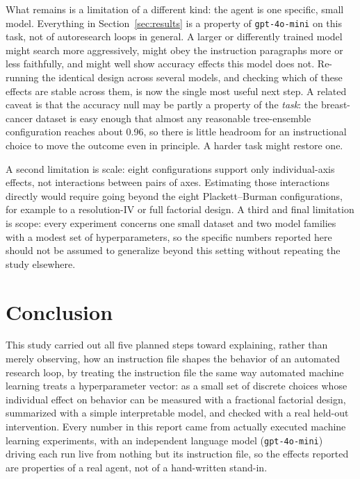 \documentclass[11pt]{article}
\begin{document}
What remains is a limitation of a different kind: the agent is one specific, small model. Everything in Section~\ref{sec:results} is a property of \texttt{gpt-4o-mini} on this task, not of autoresearch loops in general. A larger or differently trained model might search more aggressively, might obey the instruction paragraphs more or less faithfully, and might well show accuracy effects this model does not. Re-running the identical design across several models, and checking which of these effects are stable across them, is now the single most useful next step. A related caveat is that the accuracy null may be partly a property of the \emph{task}: the breast-cancer dataset is easy enough that almost any reasonable tree-ensemble configuration reaches about 0.96, so there is little headroom for an instructional choice to move the outcome even in principle. A harder task might restore one.

A second limitation is scale: eight configurations support only individual-axis effects, not interactions between pairs of axes. Estimating those interactions directly would require going beyond the eight Plackett--Burman configurations, for example to a resolution-IV or full factorial design. A third and final limitation is scope: every experiment concerns one small dataset and two model families with a modest set of hyperparameters, so the specific numbers reported here should not be assumed to generalize beyond this setting without repeating the study elsewhere.

\section{Conclusion}
\label{sec:conclusion}

This study carried out all five planned steps toward explaining, rather than merely observing, how an instruction file shapes the behavior of an automated research loop, by treating the instruction file the same way automated machine learning treats a hyperparameter vector: as a small set of discrete choices whose individual effect on behavior can be measured with a fractional factorial design, summarized with a simple interpretable model, and checked with a real held-out intervention. Every number in this report came from actually executed machine learning experiments, with an independent language model (\texttt{gpt-4o-mini}) driving each run live from nothing but its instruction file, so the effects reported are properties of a real agent, not of a hand-written stand-in.
\end{document}
